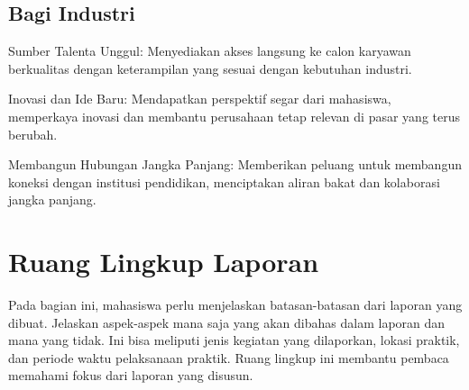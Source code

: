 \subsection{Bagi Industri}

\begin{packed_enum}
	\item Sumber Talenta Unggul: Menyediakan akses langsung ke calon karyawan berkualitas dengan keterampilan yang sesuai dengan kebutuhan industri.
	\item Inovasi dan Ide Baru: Mendapatkan perspektif segar dari mahasiswa, memperkaya inovasi dan membantu perusahaan tetap relevan di pasar yang terus berubah.
	\item Membangun Hubungan Jangka Panjang: Memberikan peluang untuk membangun koneksi dengan institusi pendidikan, menciptakan aliran bakat dan kolaborasi jangka panjang.
\end{packed_enum}

\section{Ruang Lingkup Laporan}
Pada bagian ini, mahasiswa perlu menjelaskan batasan-batasan dari laporan yang dibuat. Jelaskan aspek-aspek mana saja yang akan dibahas dalam laporan dan mana yang tidak. Ini bisa meliputi jenis kegiatan yang dilaporkan, lokasi praktik, dan periode waktu pelaksanaan praktik. Ruang lingkup ini membantu pembaca memahami fokus dari laporan yang disusun.